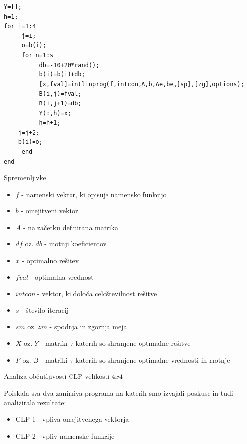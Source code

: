 \documentclass[t]{beamer}
\begin{document}
\lstset{language=Matlab} 
\begin{lstlisting}
Y=[];
h=1;
for i=1:4
     j=1;
     o=b(i);
     for n=1:s
          db=-10+20*rand();
          b(i)=b(i)+db;
          [x,fval]=intlinprog(f,intcon,A,b,Ae,be,[sp],[zg],options);
          B(i,j)=fval;
          B(i,j+1)=db;
          Y(:,h)=x;
          h=h+1;
	j=j+2;
	b(i)=o;
     end
end
\end{lstlisting}

\begin{frame}{Spremenljivke}
\begin{itemize}
\item $f$ - namenski vektor, ki opisuje namensko funkcijo
\item $b$ - omejitveni vektor
\item $A$ - na začetku definirana matrika
\item $df$ oz. $db$ - motnji koeficientov
\item $x$ - optimalno rešitev
\item $fval$ - optimalna vrednost
\item $intcon$ - vektor, ki določa celoštevilnost rešitve
\item $s$ - število iteracij
\item $sm$ oz. $zm$ - spodnja in zgornja meja
\item $X$ oz. $Y$ - matriki v katerih so shranjene optimalne rešitve
\item $F$ oz. $B$ - matriki v katerih so shranjene optimalne vrednosti in motnje
\end{itemize}
\end{frame}

\begin{frame}{Analiza občutljivosti CLP velikosti $4x4$}
\begin{center}
Poiskala sva dva zanimiva programa na katerih smo izvajali poskuse in tudi analizirala rezultate:
\begin{itemize}
\item CLP-1 - vpliva omejitvenega vektorja
\item CLP-2 - vpliv namenske funkcije
\end{itemize}
\end{center}
\end{frame}
\end{document}
